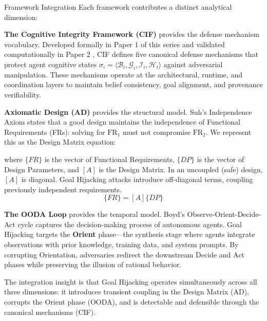 \documentclass[
  ignorenonframetext,
]{beamer}
\begin{document}
\begin{frame}[allowframebreaks]{Framework Integration}
\protect{}\label{framework-integration}
Each framework contributes a distinct analytical dimension:

\textbf{The Cognitive Integrity Framework (CIF)} provides the defense
mechanism vocabulary. Developed formally in Paper 1 of this series
\cite{friedman2026cogsec1} and validated computationally in Paper 2
\cite{friedman2026cogsec2}, CIF defines five canonical defense
mechanisms that protect agent cognitive states
\(\sigma_i = \langle \mathcal{B}_i, \mathcal{G}_i, \mathcal{I}_i, \mathcal{H}_i \rangle\)
against adversarial manipulation. These mechanisms operate at the
architectural, runtime, and coordination layers to maintain belief
consistency, goal alignment, and provenance verifiability.

\textbf{Axiomatic Design (AD)} provides the structural model. Suh's
Independence Axiom \cite{suh2001axiomatic} states that a good design
maintains the independence of Functional Requirements (FRs): solving for
\(\text{FR}_1\) must not compromise \(\text{FR}_2\). We represent this
as the Design Matrix equation:

where \(\{FR\}\) is the vector of Functional Requirements, \(\{DP\}\) is
the vector of Design Parameters, and \([A]\) is the Design Matrix. In an
uncoupled (safe) design, \([A]\) is diagonal. Goal Hijacking attacks
introduce off-diagonal terms, coupling previously independent
requirements. \begin{equation}
\{FR\} = [A]\{DP\}
\label{eq:meth_design_matrix}
\end{equation}

\textbf{The OODA Loop} provides the temporal model. Boyd's
Observe-Orient-Decide-Act cycle
\cite{boyd1987patterns, osinga2007science} captures the decision-making
process of autonomous agents. Goal Hijacking targets the \textbf{Orient}
phase---the synthesis stage where agents integrate observations with
prior knowledge, training data, and system prompts. By corrupting
Orientation, adversaries redirect the downstream Decide and Act phases
while preserving the illusion of rational behavior.

The integration insight is that Goal Hijacking operates simultaneously
across all three dimensions: it introduces transient coupling in the
Design Matrix (AD), corrupts the Orient phase (OODA), and is detectable
and defensible through the canonical mechanisms (CIF).
\end{frame}
\end{document}
